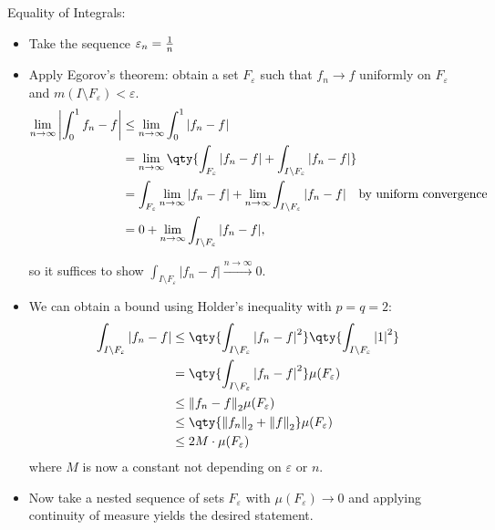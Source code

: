 \begin{solution}

Equality of Integrals:

\begin{itemize}
\item
  Take the sequence \(\varepsilon_n = {1\over n}\)
\item
  Apply Egorov's theorem: obtain a set \(F_\varepsilon\) such that
  \(f_n \to f\) uniformly on \(F_\varepsilon\) and
  \(m(I\setminus F_\varepsilon) < \varepsilon\).
  \begin{align*}
  \lim_{n\to \infty} {\left\lvert { \int_0^1 f_n - f } \right\rvert}
  &\leq \lim_{n\to\infty} \int_0^1 {\left\lvert {f_n - f} \right\rvert} \\
  &= \lim_{n\to\infty} \qty{ \int_{F_\varepsilon} {\left\lvert {f_n - f} \right\rvert} + \int_{I\setminus F_\varepsilon} {\left\lvert {f_n - f} \right\rvert} } \\
  &= \int_{F_\varepsilon} \lim_{n\to\infty} {\left\lvert {f_n - f} \right\rvert} + \lim_{n\to\infty} \int_{I\setminus F_\varepsilon} {\left\lvert {f_n - f} \right\rvert} \quad\text{by uniform convergence} \\ 
  &= 0 + \lim_{n\to\infty} \int_{I\setminus F_\varepsilon} {\left\lvert {f_n - f} \right\rvert}
  ,\end{align*}

  so it suffices to show
  \(\int_{I\setminus F_\varepsilon} {\left\lvert {f_n - f} \right\rvert} \overset{n\to\infty}\to 0\).
\item
  We can obtain a bound using Holder's inequality with \(p=q=2\):
  \begin{align*}
  \int_{I\setminus F_\varepsilon} {\left\lvert {f_n - f} \right\rvert} 
  &\leq \qty{ \int_{I\setminus F_\varepsilon} {\left\lvert {f_n - f} \right\rvert}^2 } \qty{ \int_{I\setminus F_\varepsilon} {\left\lvert {1} \right\rvert}^2  } \\
  &= \qty{ \int_{I\setminus F_\varepsilon} {\left\lvert {f_n - f} \right\rvert}^2 } \mu(F_\varepsilon) \\
  &\leq {\left\lVert {f_n - f} \right\rVert}_2 \mu(F_\varepsilon) \\
  &\leq \qty{ {\left\lVert {f_n} \right\rVert}_2 + {\left\lVert {f} \right\rVert}_2 } \mu(F_\varepsilon) \\
  &\leq 2M \cdot \mu(F_\varepsilon)
  \end{align*}
  where \(M\) is now a constant not depending on \(\varepsilon\) or
  \(n\).
\item
  Now take a nested sequence of sets \(F_{\varepsilon}\) with
  \(\mu(F_\varepsilon) \to 0\) and applying continuity of measure yields
  the desired statement.
\end{itemize}

\end{solution}

